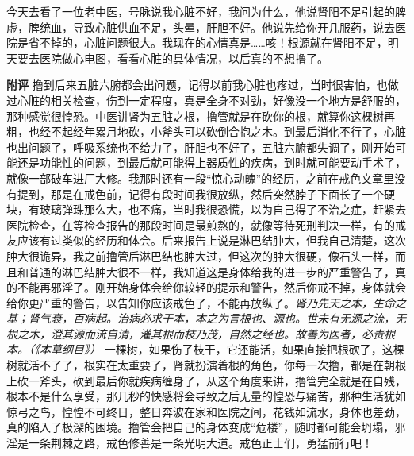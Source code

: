 \begin{case}
    今天去看了一位老中医，号脉说我心脏不好，我问为什么，他说肾阳不足引起的脾虚，脾统血，导致心脏供血不足，头晕，肝胆不好。他说先给你开几服药，说去医院是省不掉的，心脏问题很大。我现在的心情真是……咳！根源就在肾阳不足，明天要去医院做心电图，看看心脏的具体情况，以后真的不想撸了。

    \textbf{附评} 撸到后来五脏六腑都会出问题，记得以前我心脏也疼过，当时很害怕，也做过心脏的相关检查，伤到一定程度，真是全身不对劲，好像没一个地方是舒服的，那种感觉很惶恐。中医讲肾为五脏之根，撸管就是在砍你的根，就算你这棵树再粗，也经不起经年累月地砍，小斧头可以砍倒合抱之木。到最后消化不行了，心脏也出问题了，呼吸系统也不给力了，肝胆也不好了，五脏六腑都失调了，刚开始可能还是功能性的问题，到最后就可能得上器质性的疾病，到时就可能要动手术了，就像一部破车进厂大修。我那时还有一段“惊心动魄”的经历，之前在戒色文章里没有提到，那是在戒色前，记得有段时间我很放纵，然后突然脖子下面长了一个硬块，有玻璃弹珠那么大，也不痛，当时我很恐慌，以为自己得了不治之症，赶紧去医院检查，在等检查报告的那段时间是最煎熬的，就像等待死刑判决一样，有的戒友应该有过类似的经历和体会。后来报告上说是淋巴结肿大，但我自己清楚，这次肿大很诡异，我之前撸管后淋巴结也肿大过，但这次的肿大很硬，像石头一样，而且和普通的淋巴结肿大很不一样，我知道这是身体给我的进一步的严重警告了，真的不能再邪淫了。刚开始身体会给你较轻的提示和警告，然后你戒不掉，身体就会给你更严重的警告，以告知你应该戒色了，不能再放纵了。\textit{肾乃先天之本，生命之基；肾气衰，百病起。治病必求于本，本之为言根也、源也。世未有无源之流，无根之木，澄其源而流自清，灌其根而枝乃茂，自然之经也。故善为医者，必责根本。（《本草纲目》）} 一棵树，如果伤了枝干，它还能活，如果直接把根砍了，这棵树就活不了了，根实在太重要了，肾就扮演着根的角色，你每一次撸，都是在朝根上砍一斧头，砍到最后你就疾病缠身了，从这个角度来讲，撸管完全就是在自残，根本不是什么享受，那几秒的快感将会导致之后无量的惶恐与痛苦，那种生活犹如惊弓之鸟，惶惶不可终日，整日奔波在家和医院之间，花钱如流水，身体也差劲，真的陷入了极深的困境。撸管会把自己的身体变成“危楼”，随时都可能会坍塌，邪淫是一条荆棘之路，戒色修善是一条光明大道。戒色正士们，勇猛前行吧！
\end{case}

